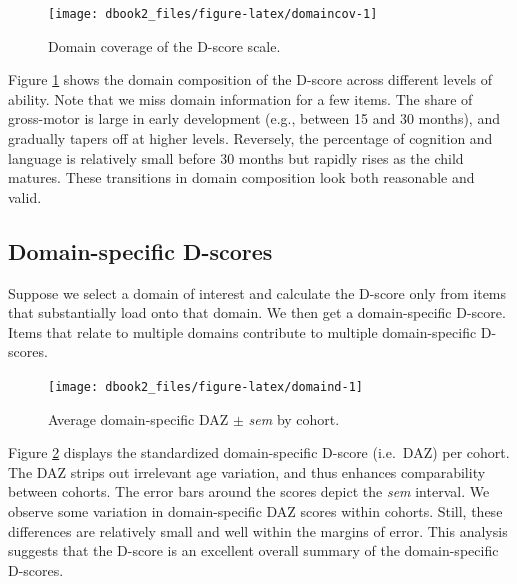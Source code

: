 \documentclass[
]{book}
\begin{document}
\begin{figure}

{\centering \texttt{[image: dbook2\_files/figure-latex/domaincov-1]} 

}

\caption{Domain coverage of the D-score scale.}\label{fig:domaincov}
\end{figure}



Figure \ref{fig:domaincov} shows the domain composition of the D-score across different levels of ability. Note that we miss domain information for a few items. The share of gross-motor is large in early development (e.g., between 15 and 30 months), and gradually tapers off at higher levels. Reversely, the percentage of cognition and language is relatively small before 30 months but rapidly rises as the child matures. These transitions in domain composition look both reasonable and valid.

\hypertarget{domain-specific-d-scores}{%
\subsection{Domain-specific D-scores}\label{domain-specific-d-scores}}

Suppose we select a domain of interest and calculate the D-score only from items that substantially load onto that domain. We then get a domain-specific D-score. Items that relate to multiple domains contribute to multiple domain-specific D-scores.

\begin{figure}

{\centering \texttt{[image: dbook2\_files/figure-latex/domaind-1]} 

}

\caption{Average domain-specific DAZ \(\pm\) \emph{sem} by cohort.}\label{fig:domaind}
\end{figure}



Figure \ref{fig:domaind} displays the standardized domain-specific D-score (i.e.~DAZ) per cohort. The DAZ strips out irrelevant age variation, and thus enhances comparability between cohorts. The error bars around the scores depict the \emph{sem} interval. We observe some variation in domain-specific DAZ scores within cohorts. Still, these differences are relatively small and well within the margins of error. This analysis suggests that the D-score is an excellent overall summary of the domain-specific D-scores.
\end{document}
